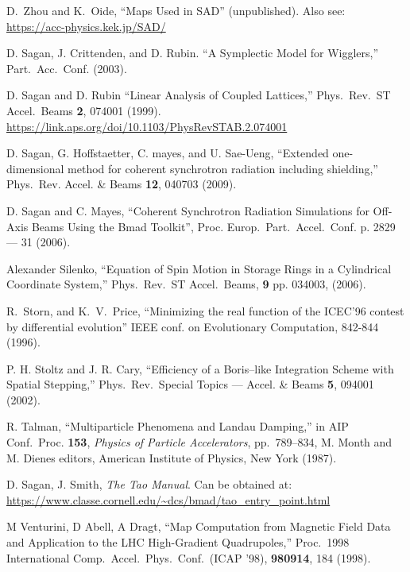 \begin{thebibliography}{XXXXXXX99}
D.~Zhou and K.~Oide, ``Maps Used in SAD'' (unpublished).
Also see:
\hfill\break
\hspace*{0.3in} \url{https://acc-physics.kek.jp/SAD/}

D. Sagan, J. Crittenden, and D. Rubin.
``A Symplectic Model for Wigglers,'' Part.\ Acc.\ Conf. (2003).

D. Sagan and D. Rubin ``Linear Analysis of Coupled Lattices,''
Phys.\ Rev.\ ST Accel.\ Beams {\bf 2}, 074001 (1999).
\hfill\break
\hspace*{20pt} 
\url{https://link.aps.org/doi/10.1103/PhysRevSTAB.2.074001}

D. Sagan, G. Hoffstaetter, C. mayes, and U. Sae-Ueng,
``Extended one-dimensional method for coherent synchrotron radiation including shielding,''
Phys.\ Rev. Accel. \& Beams {\bf 12}, 040703 (2009).

D. Sagan and C. Mayes, 
``Coherent Synchrotron Radiation Simulations for Off-Axis Beams Using the Bmad Toolkit'',
Proc. Europ.\ Part.\ Accel.\ Conf. p. 2829 --- 31 (2006).

Alexander Silenko, 
``Equation of Spin Motion in Storage Rings in a Cylindrical Coordinate System,''
Phys.\ Rev.\ ST Accel.\ Beams, {\bf 9} pp. 034003, (2006).


R.~Storn, and K.~V.~Price, ``Minimizing the real function of the
ICEC'96 contest by differential evolution'' IEEE conf. on Evolutionary
Computation, 842-844 (1996).

P. H. Stoltz and J. R. Cary, ``Efficiency of a Boris--like Integration
Scheme with Spatial Stepping,'' Phys.\ Rev.\ Special Topics ---
Accel. \& Beams {\bf 5}, 094001 (2002).

 R. Talman, ``Multiparticle Phenomena and
Landau Damping,'' in AIP Conf.\ Proc.  {\bf 153}, {\em Physics of
Particle Accelerators}, pp.~789--834, M. Month and M. Dienes editors,
American Institute of Physics, New York (1987).

D. Sagan, J. Smith, {\it The Tao Manual}.
Can be obtained at: \hfill\break
\hspace*{0.3in}
\url{https://www.classe.cornell.edu/~dcs/bmad/tao_entry_point.html}

M Venturini, D Abell, A Dragt, 
``Map Computation from Magnetic Field Data and Application to the LHC
High-Gradient Quadrupoles,'' 
Proc.\ 1998 International Comp.\ Accel.\ Phys.\ Conf.\ (ICAP '98),
{\bf 980914}, 184 (1998).


\end{thebibliography}
